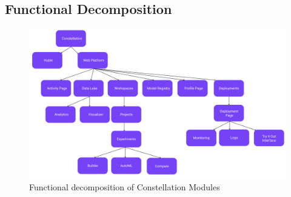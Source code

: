 \documentclass[12pt,a4paper]{report}     %
\begin{document}
\begin{normalsize}
{\subsection{Functional Decomposition}
\begin{figure}[H]
    \centering
    \includegraphics[scale=0.5]{diagrams/Functional_decomposition.png}
        \caption{Functional decomposition of Constellation Modules}
    \label{}
\end{figure}
}
\end{normalsize}
\end{document}
